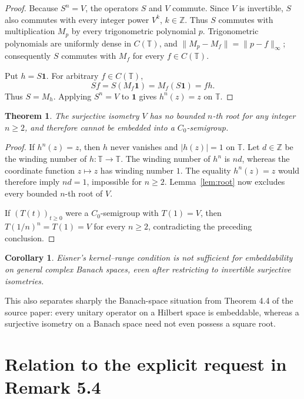 \documentclass[11pt]{article}
\newtheorem{theorem}{Theorem}
\newtheorem{corollary}{Corollary}
\newcommand{\Torus}{\mathbb T}
\begin{document}
\begin{proof}
Because \(S^n=V\), the operators \(S\) and \(V\) commute.  Since \(V\) is
invertible, \(S\) also commutes with every integer power \(V^k\),
\(k\in\mathbb Z\).  Thus \(S\) commutes with multiplication \(M_p\) by
every trigonometric polynomial \(p\).  Trigonometric polynomials are
uniformly dense in \(C(\Torus)\), and
\(\lVert M_p-M_f\rVert=\lVert p-f\rVert_\infty\); consequently \(S\)
commutes with \(M_f\) for every \(f\in C(\Torus)\).

Put \(h=S\mathbf1\).  For arbitrary \(f\in C(\Torus)\),
\[
  Sf=S(M_f\mathbf1)=M_f(S\mathbf1)=fh.
\]
Thus \(S=M_h\).  Applying \(S^n=V\) to \(\mathbf1\) gives
\(h^n(z)=z\) on \(\Torus\).
\end{proof}

\begin{theorem}
The surjective isometry \(V\) has no bounded \(n\)-th root for any integer
\(n\geq2\), and therefore cannot be embedded into a \(C_0\)-semigroup.
\end{theorem}

\begin{proof}
If \(h^n(z)=z\), then \(h\) never vanishes and \(|h(z)|=1\) on \(\Torus\).
Let \(d\in\mathbb Z\) be the winding number of \(h:\Torus\to\Torus\).
The winding number of \(h^n\) is \(nd\), whereas the coordinate function
\(z\mapsto z\) has winding number \(1\).  The equality \(h^n(z)=z\) would
therefore imply \(nd=1\), impossible for \(n\geq2\).  Lemma~\ref{lem:root}
now excludes every bounded \(n\)-th root of \(V\).

If \((T(t))_{t\geq0}\) were a \(C_0\)-semigroup with \(T(1)=V\), then
\(T(1/n)^n=T(1)=V\) for every \(n\geq2\), contradicting the preceding
conclusion.
\end{proof}

\begin{corollary}
Eisner's kernel--range condition is not sufficient for embeddability on
general complex Banach spaces, even after restricting to invertible
surjective isometries.
\end{corollary}

This also separates sharply the Banach-space situation from Theorem 4.4 of
the source paper: every unitary operator on a Hilbert space is embeddable,
whereas a surjective isometry on a Banach space need not even possess a
square root.

\section*{Relation to the explicit request in Remark 5.4}
\end{document}
